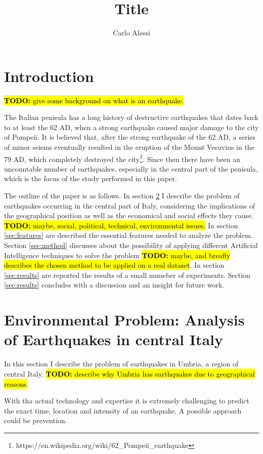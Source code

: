 \documentclass[10pt,a4paper]{article}
\title{Title}
\author{Carlo Alessi}
\newcommand{\todo}[1]{\hl{\textbf{TODO:} #1}}
\begin{document}
\maketitle

\section{Introduction}
\todo{give some background on what is an earthquake.}

The Italian penisula has a long history of destructive earthquakes that dates back to at least the 62 AD, when a strong earthquake caused major damage to the city of Pompeii. It is believed that, after the strong earthquake of the 62 AD, a series of minor seisms eventually resulted in the eruption of the Mount Vesuvius in the 79 AD, which completely destroyed the city\footnote{https://en.wikipedia.org/wiki/62\_Pompeii\_earthquake}. 
Since then there have been an uncountable number of earthquakes, especially in the central part of the penisula, which is the focus of the study performed in this paper.

The outline of the paper is as follows. In section \ref{sec:central_italy} I describe the problem of earthquakes occurring in the central part of Italy, considering the implications of the geographical position as well as the economical and social effects they cause. \todo{ maybe, social, political, technical, environmental issues.} In section \ref{sec:features} are described the essential features needed to analyze the problem. Section \ref{sec:method} discusses about the possibility of applying different Artificial Intelligence techniques to solve the problem \todo{maybe, and breafly describes the chosen method to be applied on a real dataset}. In section \ref{sec:results} are reported the results of a small numeber of experiments. Section \ref{sec:results} concludes with a discussion and an insight for future work.

\section{Environmental Problem: Analysis of Earthquakes in central Italy} \label{sec:central_italy}
In this section I describe the problem of earthquakes in Umbria, a region of central Italy. \todo{describe why Umbria has earthquakes due to geographical reasons}.

With tha actual technology and expertise it is extremely challenging to predict the exact time, location and intensity of an earthquake. A possible approach could be prevention. 
\end{document}
